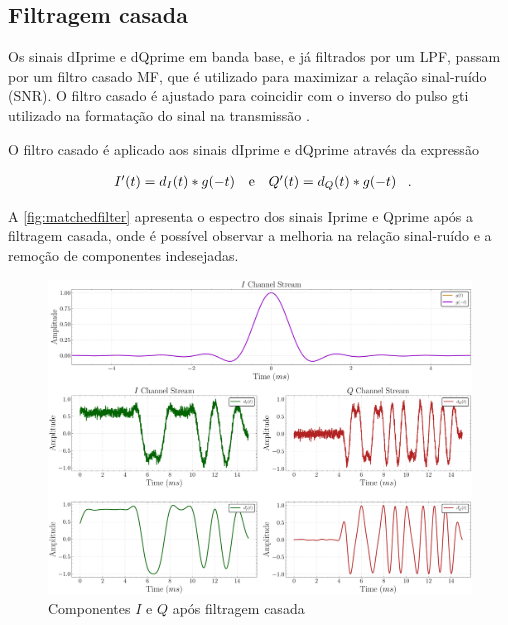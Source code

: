 \subsection{Filtragem casada}

Os sinais \gls{dIprime} e \gls{dQprime} em banda base, e já filtrados por um \gls{LPF}, passam por um filtro casado \gls{MF}, que é utilizado para maximizar a relação sinal-ruído (\gls{SNR}). O filtro casado é ajustado para coincidir com o inverso do pulso  \gls{gti} utilizado na formatação do sinal na transmissão \cite{10555531840}. 

O filtro casado é aplicado aos sinais \gls{dIprime} e \gls{dQprime} através da expressão

\vspace{-1em}
\begin{equation}
    \begin{array}{c@{\quad\text{e}\quad}c}
        I'(t) = d_I(t) * g(-t) &
        Q'(t) = d_Q(t) * g(-t)
    \end{array} \text{ .}
\end{equation}


A \autoref{fig:matchedfilter} apresenta o espectro dos sinais \gls{Iprime} e \gls{Qprime} após a filtragem casada, onde é possível observar a melhoria na relação sinal-ruído e a remoção de componentes indesejadas. 

\begin{figure}[H]
	\centering
	\caption{Componentes $I$ e $Q$ após filtragem casada}\label{fig:matchedfilter}
	\includegraphics[width=\linewidth]{assets/cap2/example_mf_time_comp.pdf}
\end{figure}


